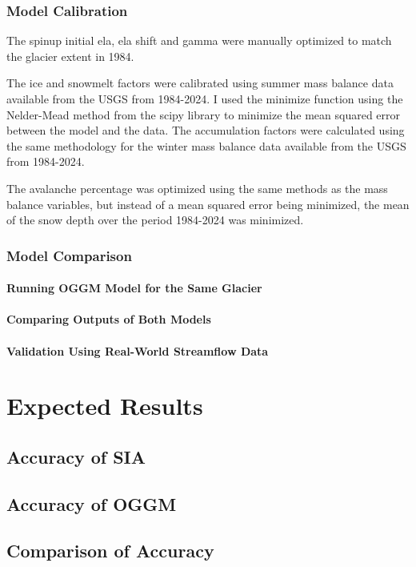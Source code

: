 \documentclass{article}
\begin{document}
\subsubsection{Model Calibration}
The spinup initial ela, ela shift and gamma were manually optimized to match the glacier extent in 1984. 

The ice and snowmelt factors were calibrated using summer mass balance data available from the USGS from 1984-2024. I used the minimize 
function using the Nelder-Mead method from the scipy library to minimize the mean squared error between the model and the data. The 
accumulation factors were calculated using the same methodology for the winter mass balance data available from the USGS from 1984-2024.

The avalanche percentage was optimized using the same methods as the mass balance variables, but instead of a mean squared error being 
minimized, the mean of the snow depth over the period 1984-2024 was minimized. 

\subsubsection{Model Comparison}
\paragraph{Running OGGM Model for the Same Glacier}
\paragraph{Comparing Outputs of Both Models}
\paragraph{Validation Using Real-World Streamflow Data }

\section{Expected Results}
\subsection{Accuracy of SIA}
\subsection{Accuracy of OGGM}
\subsection{Comparison of Accuracy}
\end{document}
